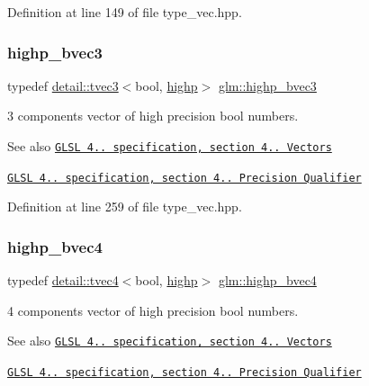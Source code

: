 Definition at line 149 of file type\+\_\+vec.\+hpp.

\mbox{\label{group__core__precision_ga1d77a773fdd024602413670788c10c62}} 
\subsubsection{\texorpdfstring{highp\+\_\+bvec3}{highp\_bvec3}}
{\footnotesize\ttfamily typedef \hyperlink{structglm_1_1detail_1_1tvec3}{detail\+::tvec3}$<$bool, \hyperlink{namespaceglm_a0f04f086094c747d227af4425893f545ac6f7eab42eacbb10d59a58e95e362074}{highp}$>$ \hyperlink{group__core__precision_ga1d77a773fdd024602413670788c10c62}{glm\+::highp\+\_\+bvec3}}

3 components vector of high precision bool numbers.

\begin{DoxySeeAlso}{See also}
\href{http://www.opengl.org/registry/doc/GLSLangSpec.4.20.8.pdf}{\tt G\+L\+SL 4.. specification, section 4.. Vectors} 

\href{http://www.opengl.org/registry/doc/GLSLangSpec.4.20.8.pdf}{\tt G\+L\+SL 4.. specification, section 4.. Precision Qualifier} 
\end{DoxySeeAlso}


Definition at line 259 of file type\+\_\+vec.\+hpp.

\mbox{\label{group__core__precision_ga381539af52c5e5c659700e12fb706eaf}} 
\subsubsection{\texorpdfstring{highp\+\_\+bvec4}{highp\_bvec4}}
{\footnotesize\ttfamily typedef \hyperlink{structglm_1_1detail_1_1tvec4}{detail\+::tvec4}$<$bool, \hyperlink{namespaceglm_a0f04f086094c747d227af4425893f545ac6f7eab42eacbb10d59a58e95e362074}{highp}$>$ \hyperlink{group__core__precision_ga381539af52c5e5c659700e12fb706eaf}{glm\+::highp\+\_\+bvec4}}

4 components vector of high precision bool numbers.

\begin{DoxySeeAlso}{See also}
\href{http://www.opengl.org/registry/doc/GLSLangSpec.4.20.8.pdf}{\tt G\+L\+SL 4.. specification, section 4.. Vectors} 

\href{http://www.opengl.org/registry/doc/GLSLangSpec.4.20.8.pdf}{\tt G\+L\+SL 4.. specification, section 4.. Precision Qualifier} 
\end{DoxySeeAlso}


